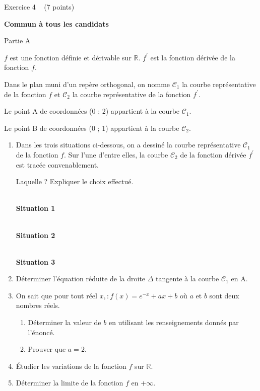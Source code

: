
%
\begin{h2}Exercice 4   (7 points)\end{h2}
\textbf{Commun  à tous les candidats}
\begin{h3}Partie A\end{h3}
$f$ est une fonction définie et dérivable sur $\mathbb{R}$. $f^{\prime}$ est la fonction dérivée de la fonction $f$.
\par
Dans le plan muni d'un repère orthogonal, on nomme $\mathscr C_{1}$ la courbe représentative de la fonction $f$ et $\mathscr C_{2}$ la courbe représentative de la fonction $f^{\prime}$.
\par
Le point A de coordonnées (0 ; 2) appartient à la courbe $\mathscr C_{1}$.
\par
Le point B de coordonnées (0 ; 1) appartient à la courbe $\mathscr C_{2}$.
\begin{enumerate}
     \item
     Dans les trois situations ci-dessous, on a dessiné la courbe représentative $\mathscr C_{1}$ de la fonction $f$. Sur l'une d'entre elles, la courbe $\mathscr C_{2}$ de la fonction dérivée $f^{\prime}$ est tracée convenablement.
     \par
     Laquelle ? Expliquer le choix effectué.
\begin{center}
\\ \textbf{Situation 1}\end{center}
\medskip
\begin{center}
\\ \textbf{Situation 2}\end{center}
\medskip
\begin{center}
\\ \textbf{Situation 3}\end{center}
     \item
     Déterminer l'équation réduite de la droite $\Delta $ tangente à la courbe $\mathscr C_{1}$ en A.
     \item
     On sait que pour tout réel $x,: f\left(x\right)=e^{-x}+ax+b$ où $a$ et $b$ sont deux nombres réels.
     \begin{enumerate}
          \item
          Déterminer la valeur de $b$ en utilisant les renseignements donnés par l'énoncé.
          \item
     Prouver que $a=2$.\end{enumerate}
     \item
     Étudier les variations de la fonction $f$ sur $\mathbb{R}$.
     \item
     Déterminer la limite de la fonction $f$ en $+ \infty $.
\end{enumerate}
